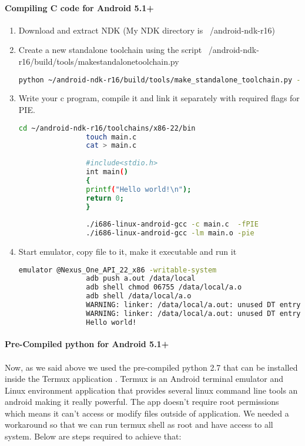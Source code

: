 \documentclass[../main.tex]{subfile}
\begin{document}
		\paragraph{Compiling C code for Android 5.1+}
		\begin{enumerate}
				\item Download and extract NDK (My NDK directory is ~/android-ndk-r16)
				\item Create a new standalone toolchain using the script ~/android-ndk-r16/build/tools/make\textunderscore standalone\textunderscore toolchain.py
				\begin{lstlisting}[language=bash]
				python ~/android-ndk-r16/build/tools/make_standalone_toolchain.py --arch x86 --api 22 --install-dir ~/android-ndk-r16/toolchains/x86-22
				\end{lstlisting}
				\item Write your c program, compile it and link it separately with required flags for PIE.
				\begin{lstlisting}[language=bash]
				cd ~/android-ndk-r16/toolchains/x86-22/bin
				touch main.c
				cat > main.c
				
				#include<stdio.h>
				int main()
				{
				printf("Hello world!\n");
				return 0;
				}
				
				./i686-linux-android-gcc -c main.c  -fPIE
				./i686-linux-android-gcc -lm main.o -pie
				\end{lstlisting}
				\item Start emulator, copy file to it, make it executable and run it
				\begin{lstlisting}[language=bash]
				emulator @Nexus_One_API_22_x86 -writable-system
				adb push a.out /data/local
				adb shell chmod 06755 /data/local/a.o
				adb shell /data/local/a.o
				WARNING: linker: /data/local/a.out: unused DT entry: type 0x6ffffffe arg 0x32c
				WARNING: linker: /data/local/a.out: unused DT entry: type 0x6fffffff arg 0x1
				Hello world!
				\end{lstlisting}
		\end{enumerate}
		
		\paragraph{Pre-Compiled python for Android 5.1+}
		\paragraph{} Now, as we said above we used the pre-compiled python 2.7 that can be installed inside the Termux application \cite{termux_website}. Termux is an Android terminal emulator and Linux environment application that provides several linux command line tools an android making it really powerful. The app doesn't require root permissions which means it can't access or modify files outside of application. We needed a workaround so that we can run termux shell as root and have access to all system. Below are steps required to achieve that:	
				
\end{document}
